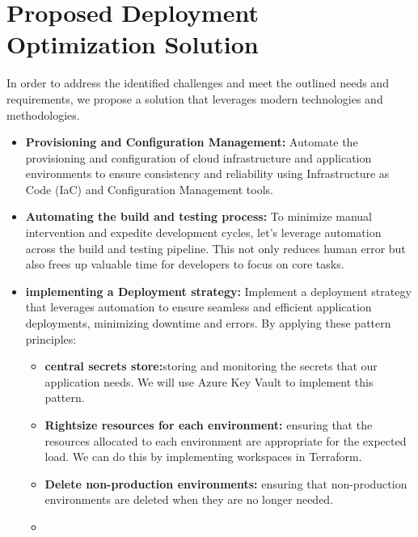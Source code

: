 \section{Proposed Deployment Optimization Solution}
In order to address the identified challenges and meet the outlined needs and requirements, we propose a solution that leverages modern technologies and methodologies.
\begin{itemize}

\item \textbf{Provisioning and Configuration Management:}
Automate the provisioning and configuration of cloud infrastructure and application environments to ensure consistency and reliability using Infrastructure as Code (IaC) and Configuration Management tools.

\item \textbf{Automating the build and testing process:}
To minimize manual intervention and expedite development cycles, let's leverage automation across the build and testing pipeline. This not only reduces human error but also frees up valuable time for developers to focus on core tasks.
\item \textbf{implementing a Deployment strategy:}
Implement a deployment strategy that leverages automation to ensure seamless and efficient application deployments, minimizing downtime and errors. By applying these pattern principles:
\begin{itemize}
    \item \textbf{central secrets store:}storing and monitoring the secrets that our application needs. We will use Azure Key Vault to implement this pattern. 
    \item \textbf{Rightsize resources for each environment:} ensuring that the resources allocated to each environment are appropriate for the expected load. We can do this by implementing workspaces in Terraform.   
    \item \textbf{Delete non-production environments:} ensuring that non-production environments are deleted when they are no longer needed.
    \item \end{itemize}
\end{itemize}


